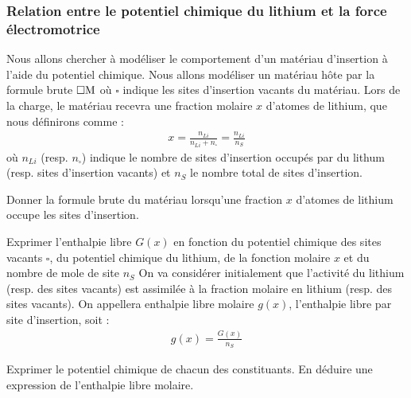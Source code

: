 \subsubsection{Relation entre le potentiel chimique du lithium et la force électromotrice}
\label{subsubsection:relation_potentiel_chimique-fem}

\setcounter{equation}{0}
\setcounter{Q}{0}

Nous allons chercher à modéliser le comportement d'un matériau d'insertion à l'aide du potentiel chimique. Nous allons modéliser un matériau hôte par la formule brute $\square\ce{M}$ où $\square$ indique les sites d'insertion vacants du matériau. Lors de la charge, le matériau recevra une fraction molaire $x$ d'atomes de lithium, que nous définirons comme : 
\begin{align*}
x = \frac{n_{Li}}{n_{Li} + n_\square} = \frac{n_{Li}}{n_S}
\end{align*}
où $n_{Li}$ (resp. $n_\square$) indique le nombre de sites d'insertion occupés par du lithum (resp. sites d'insertion vacants) et $n_S$ le nombre total de sites d'insertion.

\Q Donner la formule brute du matériau lorsqu'une fraction $x$ d'atomes de lithium occupe les sites d'insertion.

\Q \label{Q:25-02} Exprimer l'enthalpie libre $G(x)$ en fonction du potentiel chimique des sites vacants $\square$, du potentiel chimique du lithium, de la fonction molaire $x$ et du nombre de mole de site $n_S$
On va considérer initialement que l'activité du lithium (resp. des sites vacants) est assimilée à la fraction molaire en lithium (resp. des sites vacants). On appellera enthalpie libre molaire $g(x)$, l'enthalpie libre par site d'insertion, soit : 
\begin{align*}
g(x) = \frac{G(x)}{n_S}
\end{align*}

\Q Exprimer le potentiel chimique de chacun des constituants. En déduire une expression de l'enthalpie libre molaire.

